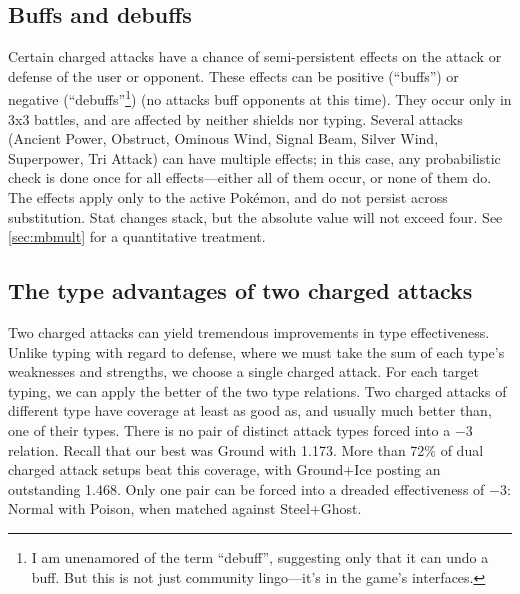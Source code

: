 \subsection{Buffs and debuffs\label{sec:buffs}}
Certain charged attacks have a chance of semi-persistent effects on the
  attack or defense of the user or opponent.
These effects can be positive (``buffs'') or negative (``debuffs''\footnote{I am unenamored of the term ``debuff'',
  suggesting only that it can undo a buff. But this is not just community lingo---it's in the
  game's interfaces.}) (no attacks buff opponents at this time).
They occur only in 3x3 battles, and are affected by neither shields nor typing.
Several attacks (Ancient Power, Obstruct, Ominous Wind, Signal Beam, Silver
  Wind, Superpower, Tri Attack) can have multiple effects; in this case, any
  probabilistic check is done once for all effects---either all of them
  occur, or none of them do.
The effects apply only to the active Pokémon, and do not persist across substitution.
Stat changes stack, but the absolute value will not exceed four.
See \autoref{sec:mbmult} for a quantitative treatment.

\subsection{The type advantages of two charged attacks\label{sec:dualcharged}}
Two charged attacks can yield tremendous improvements in type effectiveness.
Unlike typing with regard to defense, where we must take the sum of each type's
 weaknesses and strengths, we choose a single charged attack.
For each target typing, we can apply the better of the two type relations.
Two charged attacks of different type have coverage at least as good as,
  and usually much better than, one of their types.
There is no pair of distinct attack types forced into a −3 relation.
Recall that our best \ARA{} was Ground with 1.173.
More than 72\% of dual charged attack setups beat this coverage,
 with Ground+Ice posting an outstanding 1.468.
Only one pair can be forced into a dreaded effectiveness of −3:
 Normal with Poison, when matched against Steel+Ghost.


